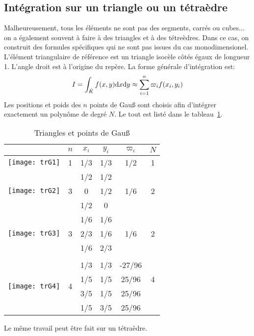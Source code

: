 \subsection*{Intégration sur un triangle ou un tétraèdre} 
Malheureusement, tous les éléments ne sont pas des segments, carrés ou cubes... on a également souvent à faire à des triangles et à des tétreèdres. Dans ce cas, on construit des formules spécifiques qui ne sont pas issues du cas monodimensionel. L'élément triangulaire de référence est un triangle isocèle côtés égaux de longueur 1. L'angle droit est à l'origine du repère. La forme générale d'intégration est: 
\begin{equation}
 I=\int_{\hat{K}} f(x,y)\text{d} x\text{d} y \approx \sum_{i=1}^n \varpi_if(x_i,y_i) 
\end{equation}
Les positions et poids des $n$ points de Gauß sont choisis afin d'intégrer exactement un polynôme de degré $N$. Le tout est listé dans le tableau~\ref{tab:IntNum:TriGauss}.
\begin{table}[ht]\centering
\begin{tabular}{cccccc} & $n$ & $x_i$ & $y_i$ & $\varpi_i$ & $N$\\ \hline \texttt{[image: trG1]} & 1 & 1/3 & 1/3 & 1/2 & 1\\ \hline \multirow{3}{*}{\texttt{[image: trG2]}} & \multirow{3}{*}{3} & 1/2 & 1/2 & \multirow{3}{*}{1/6} & \multirow{3}{*}{2}\\[+2mm] &&0&1/2&&\\[+2mm] &&1/2&0&&\\[+2mm] \hline \multirow{3}{*}{\texttt{[image: trG3]}} & \multirow{3}{*}{3} & 1/6 & 1/6 & \multirow{3}{*}{1/6} & \multirow{3}{*}{2}\\[+2mm] &&2/3 & 1/6 &&\\[+2mm] &&1/6&2/3&&\\[+2mm] \\ \hline \multirow{4}{*}{\texttt{[image: trG4]}} & \multirow{4}{*}{4} & 1/3 & 1/3 & -27/96 & \multirow{3}{*}{4}\\[+2mm] &&1/5&1/5&25/96&\\[+2mm] &&3/5&1/5&25/96&\\[+2mm] &&1/5&3/5&25/96&\\[+2mm] 
\end{tabular} 
\caption{Triangles et points de Gauß}\label{tab:IntNum:TriGauss}
\end{table} 
 Le même travail peut être fait sur un tétraèdre. 